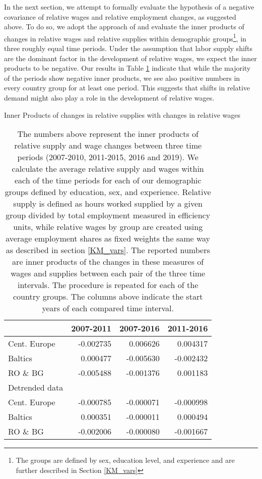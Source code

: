 \documentclass[11pt]{article}
\begin{document}
In the next section, we attempt to formally evaluate the hypothesis of a negative covariance of relative wages and relative employment changes, as suggested above. To do so, we adopt the approach of \cite{katz1992changes} and evaluate the inner products of changes in relative wages and relative supplies within demographic groups\footnote{The groups are defined by sex, education level, and experience and are further described in Section \ref{KM_vars}}, in three roughly equal time periods. Under the assumption that labor supply shifts are the dominant factor in the development of relative wages, we expect the inner products to be negative. Our results in Table \ref{inner_products_ls_w} indicate that while the majority of the periods show negative inner products, we see also positive numbers in every country group for at least one period. This suggests that shifts in relative demand might also play a role in the development of relative wages.

\begin{table}[!htbp]
\centering 
\caption{Inner Products of changes in relative supplies with changes in relative wages}
\label{inner_products_ls_w}
\begin{center}

\begin{tabular}{lrrr}
\toprule
{} &  2007-2011 &  2007-2016 &  2011-2016 \\
\midrule

Cent. Europe &  -0.002735 &   0.006626 &   0.004317 \\
Baltics   &   0.000477 &  -0.005630 &  -0.002432 \\
RO \& BG   &  -0.005488 &  -0.001376 &   0.001183 \\
\midrule
Detrended data\\
\midrule
Cent. Europe &  -0.000785 &  -0.000071 &  -0.000998 \\
Baltics   &   0.000351 &  -0.000011 &   0.000494 \\
RO \& BG   &  -0.002006 &  -0.000080 &  -0.001667 \\
\bottomrule
\end{tabular}
\caption*{\footnotesize  The numbers above represent the inner products of relative supply and wage changes between three time periods (2007-2010, 2011-2015, 2016 and 2019). We calculate the average relative supply and wages within each of the time periods for each of our demographic groups defined by education, sex, and experience. Relative supply is defined as hours worked supplied by a given group divided by total employment measured in efficiency units, while relative wages by group are created using average employment shares as fixed weights the same way as described in section \ref{KM_vars}. The reported numbers are inner products of the changes in these measures of wages and supplies between each pair of the three time intervals. The procedure is repeated for each of the country groups. The columns above indicate the start years of each compared time interval.}
\end{center}
\end{table}
\end{document}
